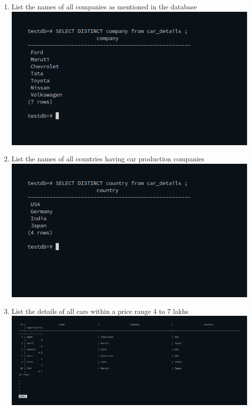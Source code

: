 \documentclass[10pt,a4paper,titlepage]{report}
\begin{document}
{\begin{enumerate}
	\item List the names of all companies as mentioned in the database\newline
		\includegraphics[width=\linewidth]{../Images/Basics/13.png}\newline
	\item List the names of all countries having car production companies\newline
		\includegraphics[width=\linewidth]{../Images/Basics/14.png}\newline
	\item List the details of all cars within a price range 4 to 7 lakhs\newline
		\includegraphics[width=\linewidth]{../Images/Basics/15.png}\newline

\end{enumerate}}
\end{document}
